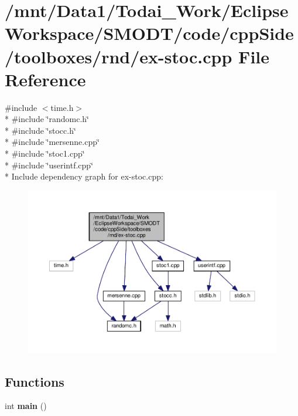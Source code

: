 \section{/mnt/\-Data1/\-Todai\-\_\-\-Work/\-Eclipse\-Workspace/\-S\-M\-O\-D\-T/code/cpp\-Side/toolboxes/rnd/ex-\/stoc.cpp File Reference}
\label{toolboxes_2rnd_2ex-stoc_8cpp}
{\ttfamily \#include $<$time.\-h$>$}\\*
{\ttfamily \#include \char`\"{}randomc.\-h\char`\"{}}\\*
{\ttfamily \#include \char`\"{}stocc.\-h\char`\"{}}\\*
{\ttfamily \#include \char`\"{}mersenne.\-cpp\char`\"{}}\\*
{\ttfamily \#include \char`\"{}stoc1.\-cpp\char`\"{}}\\*
{\ttfamily \#include \char`\"{}userintf.\-cpp\char`\"{}}\\*
Include dependency graph for ex-\/stoc.cpp\-:
\nopagebreak
\begin{figure}[H]
\begin{center}
\leavevmode
\includegraphics[width=350pt]{toolboxes_2rnd_2ex-stoc_8cpp__incl}
\end{center}
\end{figure}
\subsection*{Functions}
\begin{DoxyCompactItemize}
\item 
int {\bf main} ()
\end{DoxyCompactItemize}


